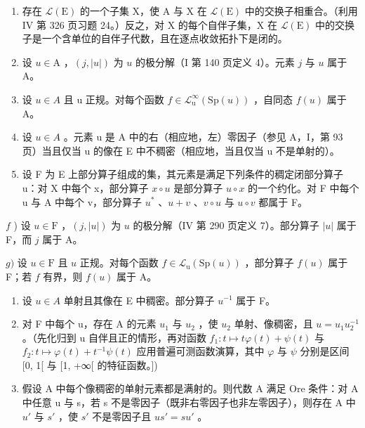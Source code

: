 \begin{enumerate}
\def\labelenumi{\alph{enumi})}
\item
  存在 \(\mathcal{L}(\mathrm{E})\) 的一个子集 X，使 A 与 X 在 \(\mathcal{L}(\mathrm{E})\) 中的交换子相重合。（利用 IV 第 326 页习题 24。）反之，对 X 的每个自伴子集，X 在 \(\mathcal{L}(\mathrm{E})\) 中的交换子是一个含单位的自伴子代数，且在逐点收敛拓扑下是闭的。
\item
  设 \(u \in \mathrm{A}\) ，\((j, |u|)\) 为 \(u\) 的极分解（I 第 140 页定义 4）。元素 \(j\) 与 \(u\) 属于 A。
\item
  设 \(u \in A\) 且 u 正规。对每个函数 \(f \in \mathcal{L}_{\mathrm{u}}^{\infty}(\mathrm{Sp}(u))\) ，自同态 \(f(u)\) 属于 A。
\item
  设 \(u \in A\) 。元素 u 是 A 中的右（相应地，左）零因子（参见 A，I，第 93 页）当且仅当 u 的像在 E 中不稠密（相应地，当且仅当 u 不是单射的）。
\item
  设 F 为 E 上部分算子组成的集，其元素是满足下列条件的稠定闭部分算子 u：对 X 中每个 x，部分算子 \(x \circ u\) 是部分算子 \(u \circ x\) 的一个约化。对 F 中每个 u 与 A 中每个 v，部分算子 \(u^{*}\) 、\(u + v\) 、\(v \circ u\) 与 \(u \circ v\) 都属于 F。
\end{enumerate}

\(f\) ) 设 \(u\in \mathrm{F}\) ，\((j,|u|)\) 为 \(u\) 的极分解（IV 第 290 页定义 7）。部分算子 \(|u|\) 属于 F，而 \(j\) 属于 A。

\(g)\) 设 \(u \in \mathrm{F}\) 且 \(u\) 正规。对每个函数 \(f \in \mathcal{L}_{\mathrm{u}}(\mathrm{Sp}(u))\) ，部分算子 \(f(u)\) 属于 F；若 \(f\) 有界，则 \(f(u)\) 属于 A。

\begin{enumerate}
\def\labelenumi{\alph{enumi})}
\setcounter{enumi}{7}
\item
  设 \(u \in A\) 单射且其像在 E 中稠密。部分算子 \(u^{-1}\) 属于 F。
\item
  对 F 中每个 u，存在 A 的元素 \(u_{1}\) 与 \(u_{2}\) ，使 \(u_{2}\) 单射、像稠密，且 \(u = u_{1}u_{2}^{-1}\) 。（先化归到 u 自伴且正的情形，再对函数 \(f_{1}: t \mapsto t\varphi(t) + \psi(t)\) 与 \(f_{2}: t \mapsto \varphi(t) + t^{-1}\psi(t)\) 应用普遍可测函数演算，其中 \(\varphi\) 与 \(\psi\) 分别是区间 {[}0, 1{[} 与 {[}1, +∞{[} 的特征函数。{]})
\item
  假设 A 中每个像稠密的单射元素都是满射的。则代数 A 满足 Ore 条件：对 A 中任意 u 与 s，若 s 不是零因子（既非右零因子也非左零因子），则存在 A 中 \(u'\) 与 \(s'\) ，使 \(s'\) 不是零因子且 \(us' = su'\) 。
\end{enumerate}

